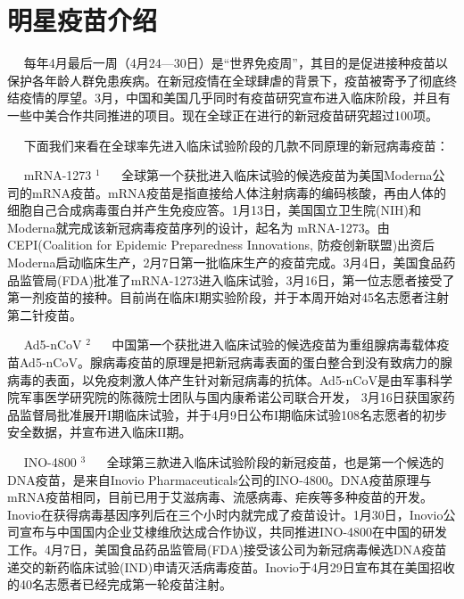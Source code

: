 \documentclass[
]{article}
\begin{document}
\vspace{5mm}

%
  \noindent{}%

\hypertarget{section-4}{%
\section{\texorpdfstring{\textcolor{glaucous}{\Huge 明星疫苗介绍}}{}}\label{section-4}}

\(\quad\)
每年4月最后一周（4月24---30日）是``世界免疫周''，其目的是促进接种疫苗以保护各年龄人群免患疾病。在新冠疫情在全球肆虐的背景下，疫苗被寄予了彻底终结疫情的厚望。3月，中国和美国几乎同时有疫苗研究宣布进入临床阶段，并且有一些中美合作共同推进的项目。现在全球正在进行的新冠疫苗研究超过100项。

\(\quad\)
下面我们来看在全球率先进入临床试验阶段的几款不同原理的新冠病毒疫苗：

\(\quad\) mRNA-1273 \(^1\) \(\quad\)
全球第一个获批进入临床试验的候选疫苗为美国Moderna公司的mRNA疫苗。mRNA疫苗是指直接给人体注射病毒的编码核酸，再由人体的细胞自己合成病毒蛋白并产生免疫应答。1月13日，美国国立卫生院(NIH)和Moderna就完成该新冠病毒疫苗序列的设计，起名为
mRNA-1273。由CEPI(Coalition for Epidemic Preparedness Innovations,
防疫创新联盟)出资后Moderna启动临床生产，2月7日第一批临床生产的疫苗完成。3月4日，美国食品药品监管局(FDA)批准了mRNA-1273进入临床试验，3月16日，第一位志愿者接受了第一剂疫苗的接种。目前尚在临床I期实验阶段，并于本周开始对45名志愿者注射第二针疫苗。

\(\quad\) Ad5-nCoV \(^2\) \(\quad\)
中国第一个获批进入临床试验的候选疫苗为重组腺病毒载体疫苗Ad5-nCoV。腺病毒疫苗的原理是把新冠病毒表面的蛋白整合到没有致病力的腺病毒的表面，以免疫刺激人体产生针对新冠病毒的抗体。Ad5-nCoV是由军事科学院军事医学研究院的陈薇院士团队与国内康希诺公司联合开发，
3月16日获国家药品监督局批准展开I期临床试验，并于4月9日公布I期临床试验108名志愿者的初步安全数据，并宣布进入临床II期。

\(\quad\) INO-4800 \(^3\) \(\quad\)
全球第三款进入临床试验阶段的新冠疫苗，也是第一个候选的DNA疫苗，是来自Inovio
Pharmaceuticals公司的INO-4800。DNA疫苗原理与mRNA疫苗相同，目前已用于艾滋病毒、流感病毒、疟疾等多种疫苗的开发。Inovio在获得病毒基因序列后在三个小时内就完成了疫苗设计。1月30日，Inovio公司宣布与中国国内企业艾棣维欣达成合作协议，共同推进INO-4800在中国的研发工作。4月7日，美国食品药品监管局(FDA)接受该公司为新冠病毒候选DNA疫苗递交的新药临床试验(IND)申请灭活病毒疫苗。Inovio于4月29日宣布其在美国招收的40名志愿者已经完成第一轮疫苗注射。
\end{document}
